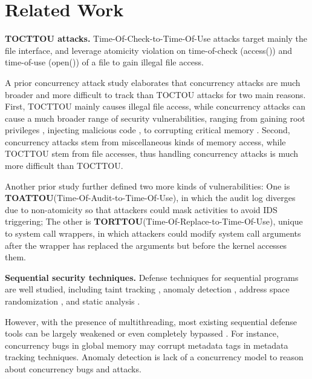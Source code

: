 \section{Related Work} \label{sec:related}


\textbf{TOCTTOU attacks.} Time-Of-Check-to-Time-Of-Use attacks \cite{bishop1996checking,tsyrklevich2003dynamic, tsafrir2008portably,wei2005tocttou}
target mainly the file interface, and
leverage atomicity violation on time-of-check (access())
and time-of-use (open()) of a file to gain illegal file access. 

A prior concurrency attack study \cite{yang2016concurrency} elaborates that concurrency
attacks are much broader and more difficult to track
than TOCTOU attacks for two main reasons. First, TOCTTOU
mainly causes illegal file access, while concurrency attacks
can cause a much broader range of security vulnerabilities,
ranging from gaining root privileges \cite{uselib-bug-12791} , injecting malicious
code \cite{freebsdcve}, to corrupting critical memory \cite{apache-bug-25520}. Second, concurrency
attacks stem from miscellaneous kinds of memory access, while
TOCTTOU stem from file accesses, thus handling concurrency
attacks is much more difficult than TOCTTOU.

Another prior study \cite{concurrency:woot07} further
defined two more kinds of vulnerabilities: One is \textbf{TOATTOU}(Time-Of-Audit-to-Time-Of-Use),
in which the audit log diverges due to non-atomicity so that attackers could mask activities to avoid IDS triggering; 
The other is \textbf{TORTTOU}(Time-Of-Replace-to-Time-Of-Use), unique to system call wrappers, in which attackers could 
modify system call arguments after the wrapper has replaced the arguments but before the kernel accesses them.

\noindent
\textbf{Sequential security techniques.} Defense techniques for sequential
programs are well studied, including taint tracking \cite{taintdroid:osdi10,lift:micro06,sospinfomationflowcontrol,valgrind:pldi}, 
anomaly detection \cite{taskrecycling:ppopp90,schonberg:pldi89}, address space
randomization \cite{aslr-fail:ccs04}, and static analysis \cite{seth:pldi,engler:vmcai,wagner:intrusion,coverity:cacm,klee:osdi08}.

However, with the presence of multithreading, most existing
sequential defense tools can be largely weakened or even
completely bypassed \cite{con-tr}. For instance, concurrency bugs
in global memory may corrupt metadata tags in metadata
tracking techniques. Anomaly detection is lack of a concurrency
model to reason about concurrency bugs and attacks.

